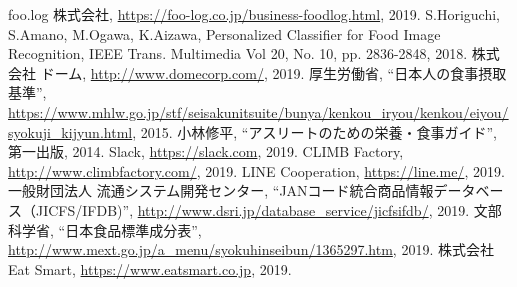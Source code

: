 \begin{thebibliography}{99}
	 foo.log 株式会社, \url{https://foo-log.co.jp/business-foodlog.html}, 2019.
	 S.Horiguchi, S.Amano, M.Ogawa, K.Aizawa, Personalized Classifier for Food Image Recognition, IEEE Trans. Multimedia Vol 20, No. 10, pp. 2836-2848, 2018.
	 株式会社 ドーム, \url{http://www.domecorp.com/}, 2019.
	 厚生労働省, ``日本人の食事摂取基準'', \url{https://www.mhlw.go.jp/stf/seisakunitsuite/bunya/kenkou_iryou/kenkou/eiyou/syokuji_kijyun.html}, 2015.
	 小林修平, ``アスリートのための栄養・食事ガイド'', 第一出版, 2014.
	 Slack, \url{https://slack.com}, 2019.
	 CLIMB Factory, \url{http://www.climbfactory.com/}, 2019.
	 LINE Cooperation, \url{https://line.me/}, 2019.
	 一般財団法人 流通システム開発センター, ``JANコード統合商品情報データベース（JICFS/IFDB)'', \url{http://www.dsri.jp/database_service/jicfsifdb/}, 2019.
	 文部科学省, ``日本食品標準成分表'', \url{http://www.mext.go.jp/a_menu/syokuhinseibun/1365297.htm}, 2019.
	 株式会社 Eat Smart, \url{https://www.eatsmart.co.jp}, 2019.
\end{thebibliography}
